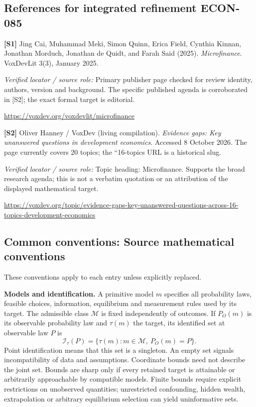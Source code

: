 \documentclass[11pt,a4paper]{article}
\begin{document}
\subsection*{References for integrated refinement ECON-085}
{\footnotesize\raggedright
\par\noindent\textbf{[S1]} Jing Cai, Muhammad Meki, Simon Quinn, Erica Field, Cynthia Kinnan, Jonathan Morduch, Jonathan de Quidt, and Farah Said (2025). \emph{Microfinance}. VoxDevLit 3(3), January 2025.\par \textit{Verified locator / source role:} Primary publisher page checked for review identity, authors, version and background. The specific published agenda is corroborated in [S2]; the exact formal target is editorial.\par \url{https://voxdev.org/voxdevlit/microfinance}\par\smallskip
\par\noindent\textbf{[S2]} Oliver Hanney / VoxDev (living compilation). \emph{Evidence gaps: Key unanswered questions in development economics}. Accessed 8 October 2026. The page currently covers 20 topics; the ``16-topics URL is a historical slug.\par \textit{Verified locator / source role:} Topic heading: Microfinance. Supports the broad research agenda; this is not a verbatim quotation or an attribution of the displayed mathematical target.\par \url{https://voxdev.org/topic/evidence-gaps-key-unanswered-questions-across-16-topics-development-economics}\par\smallskip
}

\subsection*{Common conventions: Source mathematical conventions}

These conventions apply to each entry unless explicitly replaced.

\textbf{Models and identification.} A primitive model \(m\) specifies all probability laws, feasible choices, information, equilibrium and measurement rules used by its target. The admissible class \(\mathcal M\) is fixed independently of outcomes. If \(P_O(m)\) is its observable probability law and \(\tau(m)\) the target, its identified set at observable law \(P\) is
\[
 \mathcal I_\tau(P)=\{\tau(m):m\in\mathcal M,\ P_O(m)=P\}.
\]
Point identification means that this set is a singleton. An empty set signals incompatibility of data and assumptions. Coordinate bounds need not describe the joint set. Bounds are sharp only if every retained target is attainable or arbitrarily approachable by compatible models. Finite bounds require explicit restrictions on unobserved quantities; unrestricted confounding, hidden wealth, extrapolation or arbitrary equilibrium selection can yield uninformative sets.
\end{document}
